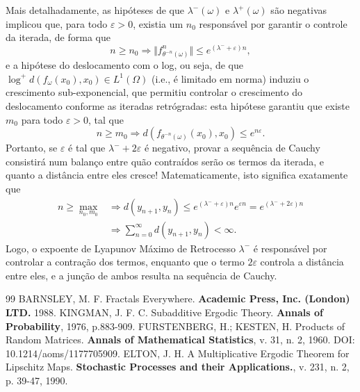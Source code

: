 \documentclass[12pt, a4paper]{article}
\theoremstyle{definition}
\begin{document}
Mais detalhadamente, as hipóteses de que \(\lambda^{-}(\omega )\) e \(\lambda^{+}(\omega )\) são negativas implicou que, para todo \(\varepsilon >0\), existia um \(n_{0}\) responsável por garantir o controle da iterada, de forma que
\[
	n\geq n_{0} \Rightarrow \Vert f_{\theta^{-n}(\omega )}^{n} \Vert\leq e^{(\lambda^{-}+\varepsilon )n},
\]
e a hipótese do deslocamento com o log, ou seja, de que \(\log^{+}{d(f_{\omega }(x_{0}), x_{0})}\in L^{1}(\Omega )\) (i.e., é limitado em norma) induziu o crescimento sub-exponencial, que permitiu controlar o crescimento do deslocamento conforme as iteradas retrógradas: esta hipótese garantiu que existe \(m_{0}\) para todo \(\varepsilon>0 \), tal que
\[
	n\geq m_{0} \Rightarrow d(f_{\theta^{-n}(\omega )}(x_{0}), x_{0}) \leq e^{n\varepsilon }.
\]
Portanto, se \(\varepsilon \) é tal que \(\lambda^{-}+2\varepsilon \) é negativo, provar a sequência de Cauchy consistirá num balanço entre quão contraídos serão os termos da iterada, e quanto a distância entre eles cresce! Matematicamente, isto significa exatamente que
\begin{align*}
	n\geq \max\limits_{n_{0}, m_{0}} & \Rightarrow d(y_{n+1}, y_{n})\leq e^{(\lambda^{-}+\varepsilon )n}e^{\varepsilon n} = e^{(\lambda^{-}+2\varepsilon )n} \\
	                                 & \Rightarrow \sum\limits_{n=0}^{\infty} d(y_{n+1}, y_{n})<\infty.
\end{align*}
Logo, o expoente de Lyapunov Máximo de Retrocesso \(\lambda^{-}\) é responsável por controlar a contração dos termos, enquanto que o termo \(2\varepsilon \) controla a distância entre eles, e a junção de ambos resulta na sequência de Cauchy.

\newpage
\begin{thebibliography}{99}
	 BARNSLEY, M. F. Fractals Everywhere. \textbf{Academic Press, Inc. (London) LTD.} 1988.
	 KINGMAN, J. F. C. Subadditive Ergodic Theory. \textbf{Annals of Probability}, 1976, p.883-909.
	 FURSTENBERG, H.; KESTEN, H. Products of Random Matrices. \textbf{Annals of Mathematical Statistics}, v. 31, n. 2, 1960. DOI: 10.1214/aoms/1177705909.
	 ELTON, J. H. A Multiplicative Ergodic Theorem for Lipschitz Maps. \textbf{Stochastic Processes and their Applications.}, v. 231, n. 2, p. 39-47, 1990.
\end{thebibliography}
\end{document}
